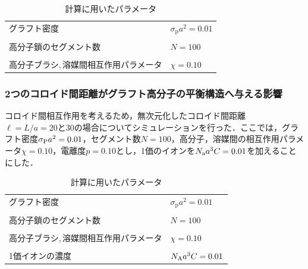 \documentclass[10.5pt,a4j]{jarticle}
\begin{document}
\begin{table}[htb]
    \caption{計算に用いたパラメータ}
    \vspace{-1.5 zh}
    \begin{center}
        \begin{tabular}{ll}\hline
            グラフト密度 & $\sigma_{\mathrm p}a^{2} = 0.01$\\ \\
            高分子鎖のセグメント数 & $N = 100$\\ \\
            高分子ブラシ,\,溶媒間相互作用パラメータ & $\chi = 0.10$\\ \hline
        \end{tabular}
    \end{center}
        \label{table3-2-1}
\end{table}
\subsubsection{2つのコロイド間距離がグラフト高分子の平衡構造へ与える影響}
コロイド間相互作用を考えるため，無次元化したコロイド間距離$\ell=L/a=20と30$の場合についてシミュレーションを行った．ここでは，グラフト密度$\sigma_{\rm{P}}a^2=0.01$，セグメント数$N=100$，高分子，溶媒間の相互作用パラメータ$\chi=0.10$，電離度$p=0.10$とし，1価のイオンを$ N_{\rm{a}}a^3C=0.01$を加えることにした．
\begin{table}[htb]
    \caption{計算に用いたパラメータ}
    \vspace{-1.5 zh}
    \begin{center}
        \begin{tabular}{ll}\hline
            グラフト密度 & $\sigma_{\mathrm p}a^{2} = 0.01$\\ \\
            高分子鎖のセグメント数 & $N = 100$\\ \\
            高分子ブラシ,\,溶媒間相互作用パラメータ & $\chi = 0.10$\\ \\
            1価イオンの濃度 & $N_{\rm{A}}a^3C=0.01$\\ \hline
        \end{tabular}
    \end{center}
        \label{table3-2-1}
\end{table}
\end{document}
